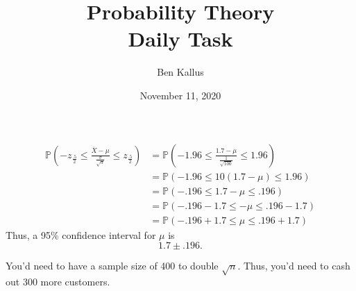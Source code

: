 \documentclass[12pt]{article}
\title{Probability Theory \\ Daily Task}
\author{Ben Kallus}
\date{November 11, 2020}
\begin{document}
\color{white}
\pagecolor{black}
\maketitle

\begin{align*}
    \mathbb P\left(-z_{\frac{.5}2} \leq \frac{\overline X - \mu}{\frac\sigma{\sqrt n}} \leq z_\frac{.5}2\right) &= 
    \mathbb P\left(-1.96 \leq \frac{1.7 - \mu}{\frac1{\sqrt{100}}} \leq 1.96\right) \\
    &= \mathbb P\left(-1.96 \leq 10(1.7 - \mu) \leq 1.96\right) \\
    &= \mathbb P\left(-.196 \leq 1.7 - \mu \leq .196\right) \\
    &= \mathbb P\left(-.196 - 1.7 \leq -\mu \leq .196 - 1.7\right) \\
    &= \mathbb P\left(-.196 + 1.7 \leq \mu \leq .196 + 1.7\right)
\end{align*} Thus, a 95\% confidence interval for $\mu$ is \[1.7 \pm .196.\]

\medskip
{} You'd need to have a sample size of 400 to double $\sqrt n$. Thus, you'd need to cash out 300 more customers.

   
 
\end{document}
